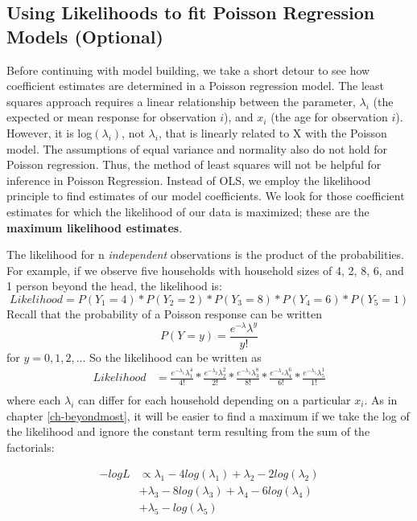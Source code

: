 \documentclass[
]{krantz}
\begin{document}
\hypertarget{likelihood.sec}{%
\subsection{Using Likelihoods to fit Poisson Regression Models (Optional)}\label{likelihood.sec}}

Before continuing with model building, we take a short detour to see how coefficient estimates are determined in a Poisson regression model. The least squares approach requires a linear relationship between the parameter, \(\lambda_i\) (the expected or mean response for observation \(i\)), and \(x_i\) (the age for observation \(i\)). However, it is log\((\lambda_i)\), not \(\lambda_i\), that is linearly related to X with the Poisson model. The assumptions of equal variance and normality also do not hold for Poisson regression. Thus, the method of least squares will not be helpful for inference in Poisson Regression. Instead of OLS, we employ the likelihood principle to find estimates of our model coefficients. We look for those coefficient estimates for which the likelihood of our data is maximized; these are the \textbf{maximum likelihood estimates}.

The likelihood for n \emph{independent} observations is the product of the probabilities. For example, if we observe five households with household sizes of 4, 2, 8, 6, and 1 person beyond the head, the likelihood is:
\[ Likelihood = P(Y_1=4)*P(Y_2=2)*P(Y_3=8)*P(Y_4=6)*P(Y_5=1)\]
Recall that the probability of a Poisson response can be written
\[P(Y=y)=\frac{e^{-\lambda}\lambda^y}{y!}\] for \(y = 0, 1, 2, ...\)
So the likelihood can be written as
\begin{align*}
 Likelihood&= \frac{ e^{-\lambda_1}\lambda_1^4 }{ 4! }*
 \frac{ e^{-\lambda_2}\lambda_2^2 }{ 2! } *\frac{e^{-\lambda_3}\lambda_3^8}{8!}*
 \frac{e^{-\lambda_4}\lambda_4^6}{6!}*\frac{e^{-\lambda_5}\lambda_5^1}{1!}\\
 \end{align*}
where each \(\lambda_i\) can differ for each household depending on a particular \(x_i\). As in chapter \ref{ch-beyondmost}, it will be easier to find a maximum if we take the log of the likelihood and ignore the constant term resulting from the sum of the factorials:

\begin{align}
 -logL& \propto \lambda_{1}-4log(\lambda_{1})+\lambda_{2}-2log(\lambda_{2}) \nonumber \\
 & +\lambda_{3}-8log(\lambda_{3})+\lambda_{4}-6log(\lambda_{4}) \nonumber \\
 & +\lambda_{5}-log(\lambda_{5})
 \label{eq:poisLoglik}
\end{align}
\end{document}
